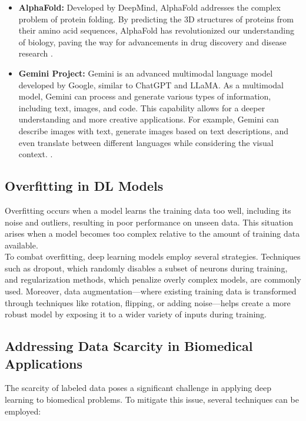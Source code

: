 \documentclass{article}
\begin{document}
\begin{itemize}
	\item \textbf{AlphaFold:} Developed by DeepMind, AlphaFold addresses the complex problem of protein folding. By predicting the 3D structures of proteins from their amino acid sequences, AlphaFold has revolutionized our understanding of biology, paving the way for advancements in drug discovery and disease research \cite{jumper2021highly}.
	
	\item \textbf{Gemini Project:} Gemini is an advanced multimodal language model developed by Google, similar to ChatGPT and LLaMA. As a multimodal model, Gemini can process and generate various types of information, including text, images, and code. This capability allows for a deeper understanding and more creative applications. For example, Gemini can describe images with text, generate images based on text descriptions, and even translate between different languages while considering the visual context. \cite{buscemi2024chatgpt}.
\end{itemize}

\subsection{Overfitting in DL Models}
Overfitting occurs when a model learns the training data too well, including its noise and outliers, resulting in poor performance on unseen data. This situation arises when a model becomes too complex relative to the amount of training data available. 
\\

To combat overfitting, deep learning models employ several strategies. Techniques such as dropout, which randomly disables a subset of neurons during training, and regularization methods, which penalize overly complex models, are commonly used. Moreover, data augmentation—where existing training data is transformed through techniques like rotation, flipping, or adding noise—helps create a more robust model by exposing it to a wider variety of inputs during training.

\subsection{Addressing Data Scarcity in Biomedical Applications}
The scarcity of labeled data poses a significant challenge in applying deep learning to biomedical problems. To mitigate this issue, several techniques can be employed:
\end{document}
